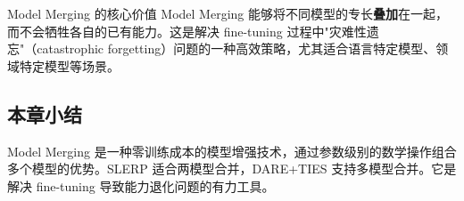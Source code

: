 \begin{importantbox}{Model Merging 的核心价值}
Model Merging 能够将不同模型的专长\textbf{叠加}在一起，而不会牺牲各自的已有能力。这是解决 fine-tuning 过程中"灾难性遗忘"（catastrophic forgetting）问题的一种高效策略，尤其适合语言特定模型、领域特定模型等场景。
\end{importantbox}

\subsection{本章小结}

Model Merging 是一种零训练成本的模型增强技术，通过参数级别的数学操作组合多个模型的优势。SLERP 适合两模型合并，DARE+TIES 支持多模型合并。它是解决 fine-tuning 导致能力退化问题的有力工具。

\newpage

